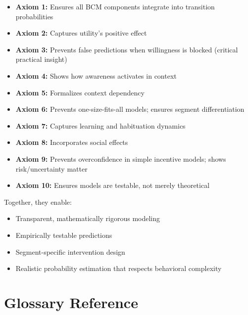 \documentclass[11pt, a4paper]{article}
\begin{document}
\begin{itemize}[nosep]

\item \textbf{Axiom 1:} Ensures all BCM components integrate into transition probabilities

\item \textbf{Axiom 2:} Captures utility's positive effect

\item \textbf{Axiom 3:} Prevents false predictions when willingness is blocked (critical practical insight)

\item \textbf{Axiom 4:} Shows how awareness activates in context

\item \textbf{Axiom 5:} Formalizes context dependency

\item \textbf{Axiom 6:} Prevents one-size-fits-all models; ensures segment differentiation

\item \textbf{Axiom 7:} Captures learning and habituation dynamics

\item \textbf{Axiom 8:} Incorporates social effects

\item \textbf{Axiom 9:} Prevents overconfidence in simple incentive models; shows risk/uncertainty matter

\item \textbf{Axiom 10:} Ensures models are testable, not merely theoretical

\end{itemize}

Together, they enable:
\begin{itemize}[nosep]
    \item Transparent, mathematically rigorous modeling
    \item Empirically testable predictions
    \item Segment-specific intervention design
    \item Realistic probability estimation that respects behavioral complexity
\end{itemize}


\section{Glossary Reference}
\end{document}

